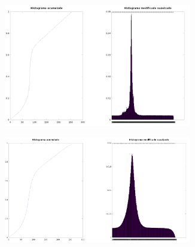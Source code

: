\documentclass{article}
\begin{document}
\begin{figure}[H]
    \begin{subfigure}{0.5\textwidth}
        \includegraphics[width=0.9\textwidth]{hpuertita1-1.png} 
    \end{subfigure}\hfill
    \begin{subfigure}{0.5\textwidth}
        \includegraphics[width=0.9\textwidth]{hpuertita1-200.png} 
    \end{subfigure}
\end{figure}
\end{document}
